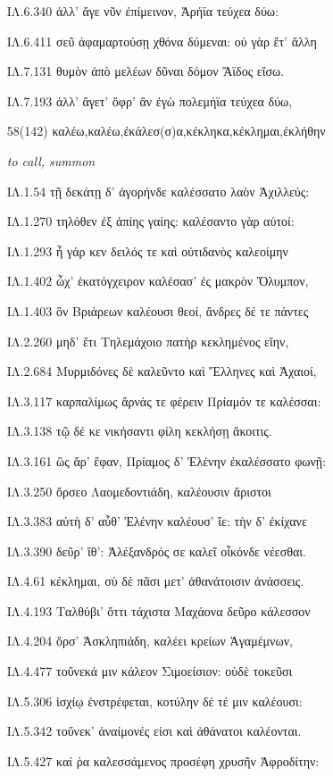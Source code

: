 \begin{enumerate}
{ΙΛ.6.340 ἀλλ' ἄγε νῦν ἐπίμεινον, Ἀρήϊα τεύχεα δύω: 

ΙΛ.6.411 σεῦ ἀφαμαρτούσῃ χθόνα δύμεναι: οὐ γὰρ ἔτ' ἄλλη 

ΙΛ.7.131 θυμὸν ἀπὸ μελέων δῦναι δόμον Ἄϊδος εἴσω. 

ΙΛ.7.193 ἀλλ' ἄγετ' ὄφρ' ἂν ἐγὼ πολεμήϊα τεύχεα δύω, 

}

\clearpage
\item[\large 58(142)]{\large \g καλέω,καλέω,ἐκάλεσ(σ)α,κέκληκα,κέκλημαι,ἐκλήθην	}

\hspace{0.2cm} \textit{ to call, summon  }

{\g
ΙΛ.1.54 τῇ δεκάτῃ δ' ἀγορήνδε καλέσσατο λαὸν Ἀχιλλεύς: 

ΙΛ.1.270 τηλόθεν ἐξ ἀπίης γαίης: καλέσαντο γὰρ αὐτοί: 

ΙΛ.1.293 ἦ γάρ κεν δειλός τε καὶ οὐτιδανὸς καλεοίμην 

ΙΛ.1.402 ὦχ' ἑκατόγχειρον καλέσασ' ἐς μακρὸν Ὄλυμπον, 

ΙΛ.1.403 ὃν Βριάρεων καλέουσι θεοί, ἄνδρες δέ τε πάντες 

ΙΛ.2.260 μηδ' ἔτι Τηλεμάχοιο πατὴρ κεκλημένος εἴην, 

ΙΛ.2.684 Μυρμιδόνες δὲ καλεῦντο καὶ Ἕλληνες καὶ Ἀχαιοί, 

ΙΛ.3.117 καρπαλίμως ἄρνάς τε φέρειν Πρίαμόν τε καλέσσαι: 

ΙΛ.3.138 τῷ δέ κε νικήσαντι φίλη κεκλήσῃ ἄκοιτις. 

ΙΛ.3.161 ὣς ἄρ' ἔφαν, Πρίαμος δ' Ἑλένην ἐκαλέσσατο φωνῇ: 

ΙΛ.3.250 ὄρσεο Λαομεδοντιάδη, καλέουσιν ἄριστοι 

ΙΛ.3.383 αὐτὴ δ' αὖθ' Ἑλένην καλέουσ' ἴε: τὴν δ' ἐκίχανε 

ΙΛ.3.390 δεῦρ' ἴθ': Ἀλέξανδρός σε καλεῖ οἶκόνδε νέεσθαι. 

ΙΛ.4.61 κέκλημαι, σὺ δὲ πᾶσι μετ' ἀθανάτοισιν ἀνάσσεις. 

ΙΛ.4.193 Ταλθύβι' ὅττι τάχιστα Μαχάονα δεῦρο κάλεσσον 

ΙΛ.4.204 ὄρσ' Ἀσκληπιάδη, καλέει κρείων Ἀγαμέμνων, 

ΙΛ.4.477 τοὔνεκά μιν κάλεον Σιμοείσιον: οὐδὲ τοκεῦσι 

ΙΛ.5.306 ἰσχίῳ ἐνστρέφεται, κοτύλην δέ τέ μιν καλέουσι: 

ΙΛ.5.342 τοὔνεκ' ἀναίμονές εἰσι καὶ ἀθάνατοι καλέονται. 

ΙΛ.5.427 καί ῥα καλεσσάμενος προσέφη χρυσῆν Ἀφροδίτην: 

}
\end{enumerate}
